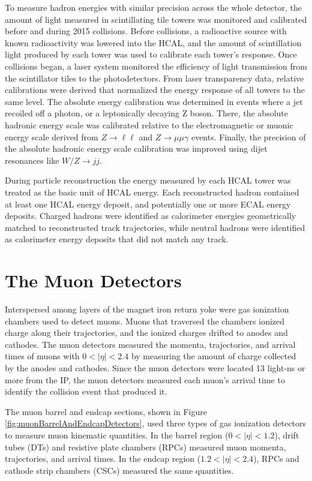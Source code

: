 To measure hadron energies with similar precision across the whole detector, the amount of light measured in scintillating tile towers 
was monitored and calibrated before and during 2015 collisions.  Before collisions, a radioactive source 
with known radioactivity was lowered into the HCAL, and the amount of scintillation light produced by each 
tower was used to calibrate each tower's response.  Once collisions began, a laser system 
monitored the efficiency of light transmission from the scintillator tiles to the photodetectors.  
From laser transparency data, relative calibrations were derived that normalized the energy response of all towers 
to the same level.  The absolute energy calibration was determined in events where a jet recoiled off a photon, or 
a leptonically decaying Z boson.  There, the absolute hadronic energy 
scale was calibrated relative to the electromagnetic or muonic energy scale derived from $Z \rightarrow \ell\ell$ 
and $Z \rightarrow \mu\mu\gamma$ events.  Finally, the precision of the absolute hadronic energy scale calibration 
was improved using dijet resonances like $W/Z \rightarrow jj$.

During particle reconstruction the energy measured by each HCAL tower was treated as the basic unit of HCAL energy.  
Each reconstructed hadron contained at least one HCAL energy deposit, and potentially one or more ECAL energy 
deposits.  Charged hadrons were identified as calorimeter energies geometrically matched to reconstructed 
track trajectories, while neutral hadrons were identified as calorimeter energy deposits that did not match any 
track.


\section{The Muon Detectors}
\label{sec:muonDetectorsDescription}
Interspersed among layers of the magnet iron return yoke were gas ionization chambers used to detect muons.  Muons 
that traversed the chambers ionized charge along their trajectories, and the ionized charges drifted to 
anodes and cathodes.  The muon detectors measured the momenta, trajectories, and arrival times of muons with $0 < |\eta| < 2.4$ by 
measuring the amount of charge collected by the anodes and cathodes.  Since the muon detectors were located 13 light-ns 
or more from the IP, the muon detectors measured each muon's arrival time to identify the collision event that produced it.

The muon barrel and endcap sections, shown in Figure \ref{fig:muonBarrelAndEndcapDetectors}, used three types of 
gas ionization detectors to measure muon kinematic quantities.  In the barrel region ($0 < |\eta| < 1.2$), 
drift tubes (DTs) and resistive plate chambers (RPCs) measured muon momenta, trajectories, and arrival times.  In 
the endcap region ($1.2 < |\eta| < 2.4$), RPCs and cathode strip chambers (CSCs) measured the same quantities.

